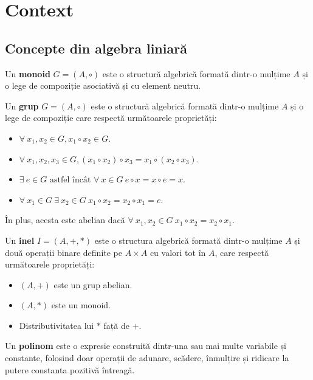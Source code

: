 \chapter{Context}

\section{Concepte din algebra liniară}

\begin{defn}
  Un \textbf{monoid} $G = (A, \circ)$ este o structură algebrică formată dintr-o
  mulțime $A$ și o lege de compoziție asociativă și cu element neutru.
\end{defn}

\begin{defn}
  Un \textbf{grup} $G = (A, \circ)$ este o structură algebrică formată dintr-o
  mulțime $A$ și o lege de compoziție care respectă următoarele proprietăți:
  \begin{itemize}
      \item{$\forall\ x_{1}, x_{2} \in G, x_{1} \circ x_{2} \in G$.}
      \item{$\forall\ x_{1}, x_{2}, x_{3} \in G, (x_{1} \circ x_{2}) \circ x_{3} = x_{1} \circ (x_{2} \circ x_{3})$.}
      \item{$\exists\ e \in G \text{ astfel
      încât } \forall\ x \in G\ e \circ x = x \circ e = x$.}
      \item{$\forall\ x_{1} \in G\ \exists\ x_{2} \in G \ x_{1} \circ x_{2} = x_{2} \circ x_{1} = e$.}
  \end{itemize}
  În plus, acesta este abelian dacă
  $\forall\ x_{1}, x_{2} \in G\ x_{1} \circ x_{2} = x_{2} \circ x_{1}$.
\end{defn}

\begin{defn}
  Un \textbf{inel} $I = (A, +, *)$ este o structura algebrică formată dintr-o
  mulțime $A$ și două operații binare definite pe $A \times A$ cu valori tot în
  $A$, care respectă următoarele proprietăți:
  \begin{itemize}
      \item{$(A, +)$ este un grup abelian.}
      \item{$(A, *)$ este un monoid.}
      \item{Distributivitatea lui $*$ față de $+$.}
  \end{itemize}
\end{defn}

\begin{defn}
  Un \textbf{polinom} este o expresie construită dintr-una sau mai multe
  variabile și constante, folosind doar operații de adunare, scădere, înmulțire
  și ridicare la putere constanta pozitivă întreagă.
\end{defn}


